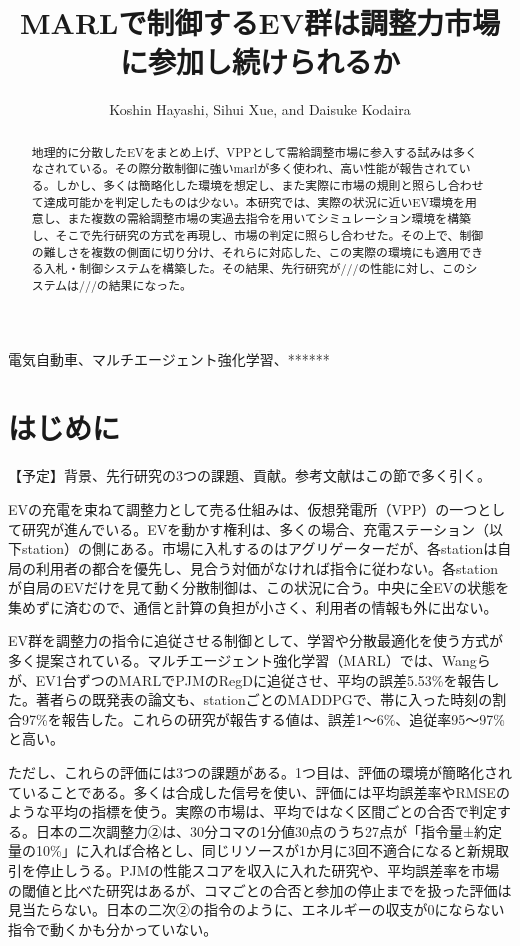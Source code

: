 \documentclass[lettersize,journal]{IEEEtran}
\newcommand{\draftnote}[1]{{\color{black!65}\small #1\par}}
\begin{document}
\title{MARLで制御するEV群は調整力市場に参加し続けられるか}
\author{Koshin Hayashi, Sihui Xue, and Daisuke Kodaira}
\maketitle
\begin{abstract}地理的に分散したEVをまとめ上げ、VPPとして需給調整市場に参入する試みは多くなされている。その際分散制御に強いmarlが多く使われ、高い性能が報告されている。しかし、多くは簡略化した環境を想定し、また実際に市場の規則と照らし合わせて達成可能かを判定したものは少ない。本研究では、実際の状況に近いEV環境を用意し、また複数の需給調整市場の実過去指令を用いてシミュレーション環境を構築し、そこで先行研究の方式を再現し、市場の判定に照らし合わせた。その上で、制御の難しさを複数の側面に切り分け、それらに対応した、この実際の環境にも適用できる入札・制御システムを構築した。その結果、先行研究が///の性能に対し、このシステムは///の結果になった。\end{abstract}
\begin{IEEEkeywords}電気自動車、マルチエージェント強化学習、******\end{IEEEkeywords}
\section{はじめに}
\draftnote{【予定】背景、先行研究の3つの課題、貢献。参考文献はこの節で多く引く。}
EVの充電を束ねて調整力として売る仕組みは、仮想発電所（VPP）の一つとして研究が進んでいる。EVを動かす権利は、多くの場合、充電ステーション（以下station）の側にある。市場に入札するのはアグリゲーターだが、各stationは自局の利用者の都合を優先し、見合う対価がなければ指令に従わない。各stationが自局のEVだけを見て動く分散制御は、この状況に合う。中央に全EVの状態を集めずに済むので、通信と計算の負担が小さく、利用者の情報も外に出ない。

EV群を調整力の指令に追従させる制御として、学習や分散最適化を使う方式が多く提案されている\cite{ref2,ref3,ref4,ref5,ref6,ref7}\cite{ref17}。マルチエージェント強化学習（MARL）では、Wangらが、EV1台ずつのMARLでPJMのRegDに追従させ、平均の誤差5.53\%を報告した\cite{ref2}。著者らの既発表の論文も、stationごとのMADDPGで、帯に入った時刻の割合97\%を報告した\cite{ref1}。これらの研究が報告する値は、誤差1〜6\%、追従率95〜97\%と高い。

ただし、これらの評価には3つの課題がある。1つ目は、評価の環境が簡略化されていることである。多くは合成した信号を使い、評価には平均誤差率やRMSEのような平均の指標を使う\cite{ref2}\cite{ref3}\cite{ref7}。実際の市場は、平均ではなく区間ごとの合否で判定する。日本の二次調整力②は、30分コマの1分値30点のうち27点が「指令量±約定量の10\%」に入れば合格とし、同じリソースが1か月に3回不適合になると新規取引を停止しうる\cite{ref15}。PJMの性能スコアを収入に入れた研究\cite{ref5}や、平均誤差率を市場の閾値と比べた研究\cite{ref7}はあるが、コマごとの合否と参加の停止までを扱った評価は見当たらない。日本の二次②の指令のように、エネルギーの収支が0にならない指令で動くかも分かっていない。
\end{document}

